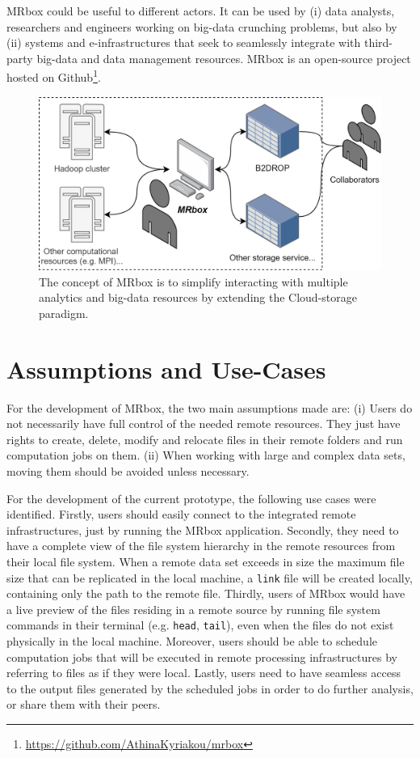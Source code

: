 MRbox could be useful to different actors. It can be used by (i) data analysts, researchers and engineers working on big-data crunching problems, but also by (ii) systems and e-infrastructures that seek to seamlessly integrate with third-party big-data and data management resources. MRbox is an open-source project hosted on Github\footnote{\url{https://github.com/AthinaKyriakou/mrbox}}.

\begin{figure}
    \centering
    \includegraphics[width=.4\textwidth]{mrbox.png}
    \caption{The concept of MRbox is to simplify interacting with multiple analytics and big-data resources by extending the Cloud-storage paradigm.}
    \label{fig:mrbox}
\end{figure}

\section{Assumptions and Use-Cases}

For the development of MRbox, the two main assumptions made are: (i) Users do not necessarily have full control of the needed remote resources. They just have rights to create, delete, modify and relocate files in their remote folders and run computation jobs on them. (ii) When working with large and complex data sets, moving them should be avoided unless necessary\cite{atkinson_malcolm_2018}.

For the development of the current prototype, the following use cases were identified. Firstly, users should easily connect to the integrated remote infrastructures, just by running the MRbox application. Secondly, they need to have a complete view of the file system hierarchy in the remote resources from their local file system. When a remote data set exceeds in size the maximum file size that can be replicated in the local machine, a \texttt{link} file will be created locally, containing only the path to the remote file. Thirdly, users of MRbox would have a live preview of the files residing in a remote source by running file system commands in their terminal (e.g. \texttt{head}, \texttt{tail}), even when the files do not exist physically in the local machine. Moreover, users should be able to schedule computation jobs that will be executed in remote processing infrastructures by referring to files as if they were local. Lastly, users need to have seamless access to the output files generated by the scheduled jobs in order to do further analysis, or share them with their peers.

